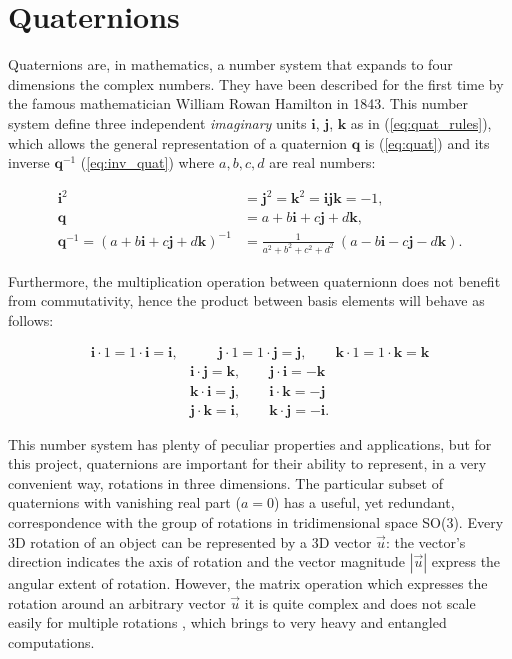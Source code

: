 \section{Quaternions} \label{ssec:quat}
    Quaternions are, in mathematics, a number system that expands to four dimensions the complex numbers. They have been described for the first time by the famous mathematician William Rowan Hamilton in 1843. This number system define three independent \textit{imaginary} units $\bm{i}$, $\bm{j}$, $\bm{k}$ as in (\ref{eq:quat_rules}), which allows the general representation of a quaternion $\bm{q}$ is (\ref{eq:quat}) and its inverse $\bm{q}^{-1}$ (\ref{eq:inv_quat}) where $a,b,c,d$ are real numbers:

    \begin{align}
        \bm{i}^2 & = \bm{j}^2 = \bm{k}^2 = \bm{i}\bm{j}\bm{k} = -1, \label{eq:quat_rules}\\
        \bm{q} & = a + b\bm{i} + c\bm{j} + d\bm{k}, \label{eq:quat}\\
        \bm{q}^{-1 } = (a + b\bm{i} + c\bm{j} + d\bm{k})^{-1} & = \frac{1}{a^2 + b^2 + c^2 +d^2}\ (a - b\bm{i} - c\bm{j} - d\bm{k}). \label{eq:inv_quat}
    \end{align}

    Furthermore, the multiplication operation between quaternionn does not benefit from commutativity, hence the product between basis elements will behave as follows:

    \begin{align}
        \bm{i} \cdot 1 = 1 \cdot \bm{i} = \bm{i}, & \qquad  \bm{j} \cdot 1 = 1 \cdot \bm{j} = \bm{j}, \qquad \bm{k} \cdot 1 = 1 \cdot \bm{k} = \bm{k} \label{eq:Ham_prod}\\
        & \bm{i} \cdot \bm{j}= \bm{k}, \qquad \bm{j} \cdot \bm{i}= -\bm{k} \nonumber \\
        & \bm{k} \cdot \bm{i}= \bm{j}, \qquad \bm{i} \cdot \bm{k}= -\bm{j} \nonumber \\
        & \bm{j} \cdot \bm{k}= \bm{i}, \qquad \bm{k} \cdot \bm{j}= -\bm{i}. \nonumber
    \end{align}

    This number system has plenty of peculiar properties and applications, but for this project, quaternions are important for their ability to represent, in a very convenient way, rotations in three dimensions. The particular subset of quaternions with vanishing real part ($a=0$) has a useful, yet redundant, correspondence with the group of rotations in tridimensional space SO(3). Every 3D rotation of an object can be represented by a 3D vector $\vec u$: the vector's direction indicates the axis of rotation and the vector magnitude $|\vec u|$ express the angular extent of rotation. However, the matrix operation which expresses the rotation around an arbitrary vector $\vec u$ it is quite complex and does not scale easily for multiple rotations \cite{10.1007/BFb0031048}, which brings to very heavy and entangled computations.

